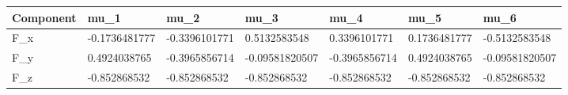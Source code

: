 \begin{tabular}{@{}lllllll@{}}
\toprule
Component & mu\_1 & mu\_2 & mu\_3 & mu\_4 & mu\_5 & mu\_6 \\
\midrule
F\_x & -0.1736481777 & -0.3396101771 & 0.5132583548 & 0.3396101771 & 0.1736481777 & -0.5132583548 \\
F\_y & 0.4924038765 & -0.3965856714 & -0.09581820507 & -0.3965856714 & 0.4924038765 & -0.09581820507 \\
F\_z & -0.852868532 & -0.852868532 & -0.852868532 & -0.852868532 & -0.852868532 & -0.852868532 \\
\bottomrule
\end{tabular}
